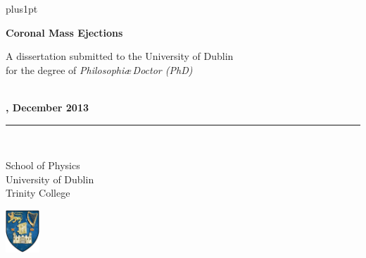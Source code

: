 \documentclass[a4paper, oneside,12pt]{Latex/Classes/PhDthesisPSnPDF}
\begin{document}
\renewcommand\baselinestretch{1.2}
\baselineskip=18pt plus1pt


\newcommand{\titlefont}{\bfseries \fontsize{22}{26.42pt}\selectfont}
\newcommand{\largetitlefont}{\bfseries \fontsize{29.88}{35.88pt}\selectfont}
\newcommand{\othertitlefont}{\fontsize{14.4}{17.28}\selectfont}
\newcommand{\authorfont}{\bfseries \fontsize{14.4}{17.28}\selectfont}
\newcommand{\informationfont}{\fontsize{10}{12}\selectfont}
\newcommand{\dedicationfont}{\slshape \fontsize{14.4}{17.28}\selectfont}

\newcommand{\thisyear}{\number\year}
\def\thismonth{\ifcase\month\or January\or February\or March\or
  April\or May\or June\or July\or August\or September\or October\or November\or December\fi}
\newcommand{\todaysdate}{\thismonth\space \thisyear}

\renewcommand{\baselinestretch}{1}
\newpage \thispagestyle{empty}
\vspace*{1.5cm}
\begin{flushright}



\Huge{\textbf{Coronal Mass Ejections}}

\end{flushright}

\vspace*{4cm}
\begin{flushright}
A dissertation submitted to the University of Dublin \\
for the degree of \emph{Philosophi\ae\,Doctor (PhD)} %
\end{flushright}

\vspace*{\fill}
\begin{flushright}
{\authorfont {Eoin P. Carley} \\[1mm]
{\othertitlefont {Trinity College Dublin}, December 2013}\\[.5mm]
\rule{0.9\textwidth}{0.5mm}\\[4mm]

\begin{minipage}[b][15mm][t]{12.5cm}
\raggedleft \sc
School of Physics\\
University of Dublin\\
Trinity College\\
\end{minipage}
\hspace*{1mm}
\begin{minipage}[b][15mm][t]{1.15cm}
\includegraphics[height=16mm]{tcd_crest.jpg}
\end{minipage}}

 \end{flushright}
\end{document}
